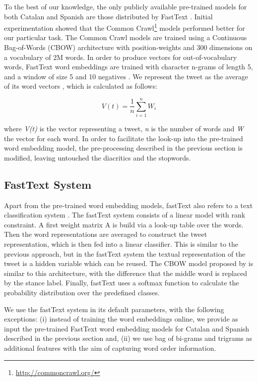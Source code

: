 \documentclass[10pt, a4paper]{article}
\begin{document}
To the best of our knowledge, the only publicly available pre-trained models for both Catalan and Spanish are those distributed by FastText \cite{Grave18}. Initial experimentation showed that the Common Crawl\footnote{\url{http://commoncrawl.org/}} models performed better for our particular task. The Common Crawl models are trained using a Continuous Bag-of-Words (CBOW) architecture with position-weights and 300 dimensions on a vocabulary of 2M words. In order to produce vectors for out-of-vocabulary words, FastText word embeddings are trained with character n-grams of length 5, and a window of size 5 and 10 negatives \cite{Grave18}. We represent the tweet as the average of its word vectors \cite{DBLP:journals/corr/KenterBR16}, which is calculated as follows:

\[V(t)=\frac{1}{n}\sum_{i=1}^{n}W_{i}\]

where \textit{V(t)} is the vector representing a tweet, \textit{n} is the number of words and \textit{W} the vector for each word. In order to facilitate the look-up into the pre-trained word embedding model, the pre-processing described in the previous section is modified, leaving untouched the diacritics and the stopwords.

\subsection{FastText System}\label{sec:fasttext-system}

Apart from the pre-trained word embedding models, fastText also refers to a text classification system \cite{joulin-etal-2017-bag}. The fastText system consists of a linear model with rank constraint. A first weight matrix A is build via a look-up table over the words. Then the word representations are averaged to construct the tweet representation, which is then fed into a linear classifier. This is similar to the previous approach, but in the fastText system the textual representation of the tweet is a hidden variable which can be reused. The CBOW model proposed by \cite{mikolov2013b} is similar to this architecture, with the difference that the middle word is replaced by the stance label. Finally, fastText uses a softmax function to calculate the probability distribution over the predefined classes.

We use the fastText system in its default parameters, with the following exceptions: (i) instead of training the word embeddings online, we provide as input the pre-trained FastText word embedding models for Catalan and Spanish described in the previous section and, (ii) we use bag of bi-grams and trigrams as additional features with the aim of capturing word order information.
\end{document}
